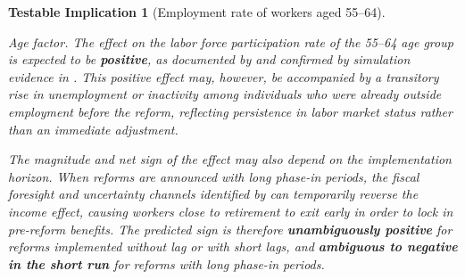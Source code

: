 \documentclass[11pt,english,a4paper, twoside, authoryear]{article}
\newtheorem{testable}{Testable Implication}}
\begin{document}
\begin{testable}[Employment rate of workers aged 55--64]\label{test:emp_old}

\textit{Age factor.} %
The effect on the labor force participation rate of the 55--64 age group is expected to be \textbf{positive}, as documented by \citet{StaubliZweimuller2013} and confirmed by simulation evidence in \citet{GruberWise1999}. This positive effect may, however, be accompanied by a transitory rise in unemployment or inactivity among individuals who were already outside employment before the reform, reflecting persistence in labor market status rather than an immediate adjustment.

The magnitude and net sign of the effect may also depend on the implementation horizon. When reforms are announced with long phase-in periods, the fiscal foresight and uncertainty channels identified by \citet{BiZubairy2023} can temporarily reverse the income effect, causing workers close to retirement to exit early in order to lock in pre-reform benefits. The predicted sign is therefore \textbf{unambiguously positive} for reforms implemented without lag or with short lags, and \textbf{ambiguous to negative in the short run} for reforms with long phase-in periods.


\end{testable}
\end{document}
